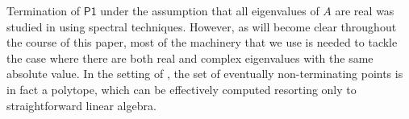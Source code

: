 

Termination of $\mathsf{P1}$ under the assumption that all eigenvalues
of $A$ are real was studied in \cite{RMM,RMM1} using spectral
techniques. However, as will become clear throughout the course of
this paper, most of the machinery that we use is needed to tackle the
case where there are both real and complex eigenvalues with the same
absolute value. In the setting of \cite{RMM,RMM1}, the set of
eventually non-terminating points is in fact a polytope, which can be
effectively computed resorting only to straightforward linear algebra.

